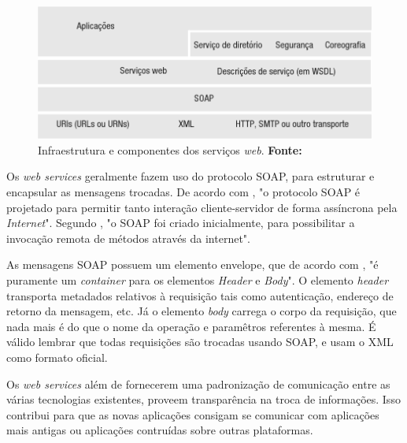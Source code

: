 \begin{figure}[h!]
	\centerline{\includegraphics[scale=0.6]{./imagens/1_q_teorico/qt2.png}}
	\caption[Infraestrutura e componentes dos serviços
		\textit{web}. ]{Infraestrutura e componentes dos serviços
		\textit{web}. \textbf{Fonte:}}
	\label{fig:qt2}
\end{figure}
	
	\par Os \textit{web services} geralmente fazem uso do protocolo SOAP, para
estruturar e encapsular as mensagens trocadas. De acordo com
, "o protocolo SOAP é projetado para permitir
tanto interação cliente-servidor de forma assíncrona pela \textit{Internet}".
Segundo , "o SOAP foi criado inicialmente, para
possibilitar a invocação remota de métodos através da internet". 

	\par As mensagens SOAP possuem um elemento envelope, que de acordo com
, "é puramente um \textit{container} para os
elementos \textit{Header} e \textit{Body}". O elemento \textit{header}
transporta metadados relativos à requisição tais como autenticação, endereço de
retorno da mensagem, etc. Já o elemento \textit{body} carrega o corpo da
requisição, que nada mais é do que o nome da operação e paramêtros referentes à
mesma. É válido lembrar que todas requisições são trocadas usando SOAP, e usam
o XML como formato oficial. 
	

	\par Os \textit{web services} além de fornecerem uma padronização de
comunicação entre as várias tecnologias existentes, proveem transparência na
troca de informações. Isso contribui para que as novas aplicações consigam se
comunicar com aplicações mais antigas ou aplicações contruídas sobre outras
plataformas.

